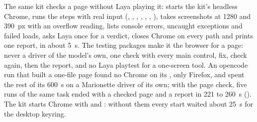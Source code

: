 The same kit checks a page without Laya playing it:  starts the kit's headless Chrome, runs the steps with real input (, , , , , , ), takes screenshots at 1280 and 390~px with an overflow reading, lists console errors, uncaught exceptions and failed loads, asks Laya once for a verdict, closes Chrome on every path and prints one report, in about 5~s. The testing packages make it the browser for a page: never a driver of the model's own, one check with every main control, fix, check again, then the report, and no Laya playtest for a one-screen tool. An opencode run that built a one-file page found no Chrome on its , only Firefox, and spent the rest of its 600~s on a Marionette driver of its own; with the page check, five runs of the same task ended with a checked page and a report in 221 to 260~s (\measured). The kit starts Chrome with  and : without them every start waited about 25~s for the desktop keyring.
